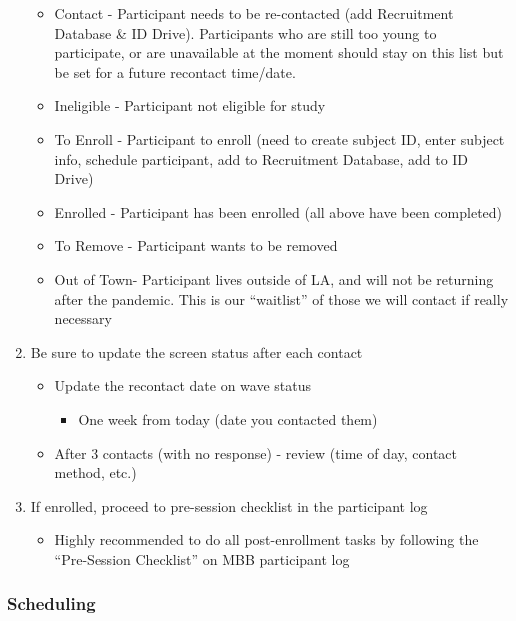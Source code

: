 \documentclass[]{book}
\providecommand{\tightlist}{%
  \setlength{\itemsep}{0pt}\setlength{\parskip}{0pt}}
\begin{document}
\begin{enumerate}
  \begin{itemize}
  \tightlist
  \item
    Contact - Participant needs to be re-contacted (add Recruitment Database \& ID Drive). Participants who are still too young to participate, or are unavailable at the moment should stay on this list but be set for a future recontact time/date.
  \item
    Ineligible - Participant not eligible for study
  \item
    To Enroll - Participant to enroll (need to create subject ID, enter subject info, schedule participant, add to Recruitment Database, add to ID Drive)
  \item
    Enrolled - Participant has been enrolled (all above have been completed)
  \item
    To Remove - Participant wants to be removed
  \item
    Out of Town- Participant lives outside of LA, and will not be returning after the pandemic. This is our ``waitlist'' of those we will contact if really necessary
  \end{itemize}
\item
  Be sure to update the screen status after each contact

  \begin{itemize}
  \tightlist
  \item
    Update the recontact date on wave status

    \begin{itemize}
    \tightlist
    \item
      One week from today (date you contacted them)
    \end{itemize}
  \item
    After 3 contacts (with no response) - review (time of day, contact method, etc.)
  \end{itemize}
\item
  If enrolled, proceed to pre-session checklist in the participant log

  \begin{itemize}
  \tightlist
  \item
    Highly recommended to do all post-enrollment tasks by following the ``Pre-Session Checklist'' on MBB participant log
  \end{itemize}
\end{enumerate}

\hypertarget{scheduling}{%
\subsubsection{Scheduling}\label{scheduling}}
\end{document}
